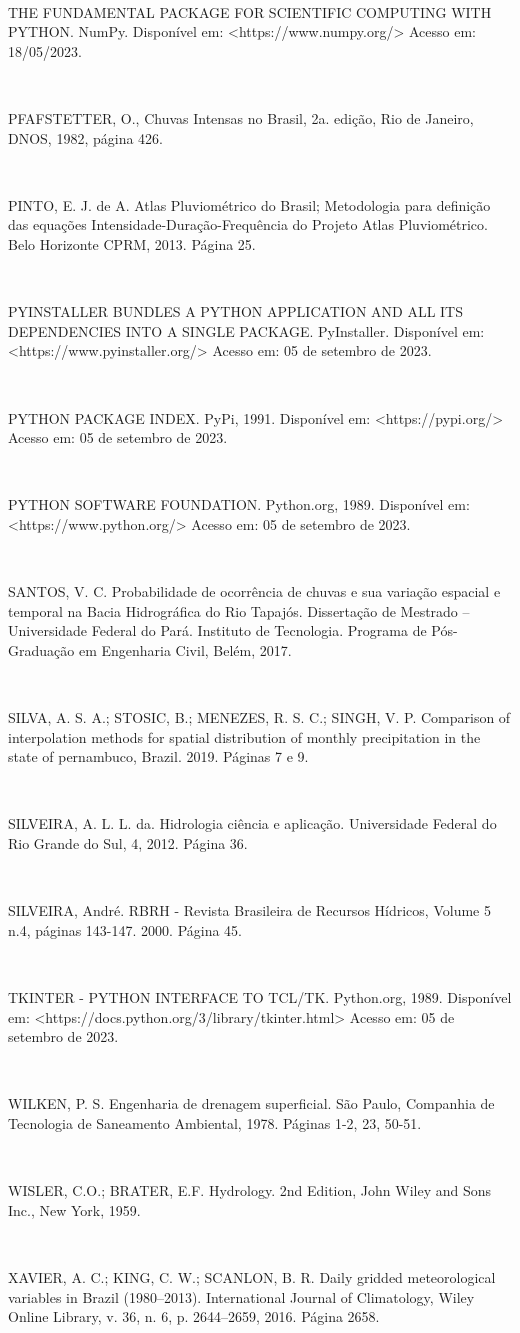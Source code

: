 \begin{flushleft}
\

THE FUNDAMENTAL PACKAGE FOR SCIENTIFIC COMPUTING WITH PYTHON. NumPy. Disponível em: <https://www.numpy.org/> Acesso em: 18/05/2023.

\

PFAFSTETTER, O., Chuvas Intensas no Brasil, 2a. edição, Rio de Janeiro, DNOS, 1982, página 426.

\

PINTO, E. J. de A. Atlas Pluviométrico do Brasil; Metodologia para definição das equações Intensidade-Duração-Frequência do Projeto Atlas Pluviométrico. Belo Horizonte CPRM, 2013. Página 25.

\

PYINSTALLER BUNDLES A PYTHON APPLICATION AND ALL ITS DEPENDENCIES INTO A SINGLE PACKAGE. PyInstaller. Disponível em: <https://www.pyinstaller.org/> Acesso em: 05 de setembro de 2023.

\

PYTHON PACKAGE INDEX. PyPi, 1991. Disponível em: <https://pypi.org/> Acesso em: 05 de setembro de 2023.

\

PYTHON SOFTWARE FOUNDATION. Python.org, 1989. Disponível em: <https://www.python.org/> Acesso em: 05 de setembro de 2023.

\

SANTOS, V. C. Probabilidade de ocorrência de chuvas e sua variação espacial e temporal na Bacia Hidrográfica do Rio Tapajós. Dissertação de Mestrado – Universidade Federal do Pará. Instituto de Tecnologia. Programa de Pós-Graduação em Engenharia Civil, Belém, 2017.

\

SILVA, A. S. A.; STOSIC, B.; MENEZES, R. S. C.; SINGH, V. P. Comparison of interpolation methods for spatial distribution of monthly precipitation in the state of pernambuco, Brazil. 2019. Páginas 7 e 9.

\

SILVEIRA, A. L. L. da. Hidrologia ciência e aplicação. Universidade Federal do Rio Grande do Sul, 4, 2012. Página 36.

\

SILVEIRA, André. RBRH - Revista Brasileira de Recursos Hídricos, Volume 5 n.4, páginas 143-147. 2000. Página 45.

\newpage

\

TKINTER - PYTHON INTERFACE TO TCL/TK. Python.org, 1989. Disponível em: <https://docs.python.org/3/library/tkinter.html> Acesso em: 05 de setembro de 2023.

\

WILKEN, P. S. Engenharia de drenagem superficial. São Paulo, Companhia de Tecnologia de Saneamento Ambiental, 1978. Páginas 1-2, 23, 50-51.

\

WISLER, C.O.; BRATER, E.F. Hydrology. 2nd Edition, John Wiley and Sons Inc., New York, 1959.

\

XAVIER, A. C.; KING, C. W.; SCANLON, B. R. Daily gridded meteorological variables in Brazil (1980–2013). International Journal of Climatology, Wiley Online Library, v. 36, n. 6, p. 2644–2659, 2016. Página 2658.
\end{flushleft}
